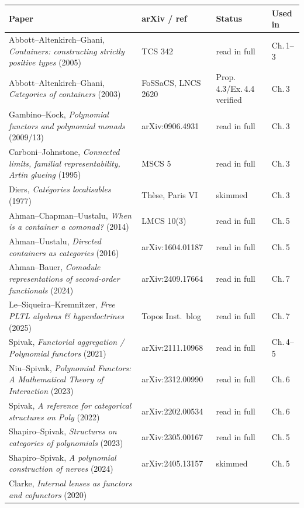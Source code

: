\documentclass[11pt,a4paper]{book}
\theoremstyle{plain}
\theoremstyle{definition}
\theoremstyle{remark}
\begin{document}
\begin{center}
\renewcommand{\arraystretch}{1.25}
\begin{tabular}{@{}p{5.4cm}p{3.1cm}p{2.4cm}p{2.6cm}@{}}
\toprule
\textbf{Paper} & \textbf{arXiv / ref} & \textbf{Status} & \textbf{Used in} \\
\midrule
Abbott--Altenkirch--Ghani, \emph{Containers: constructing strictly positive types} (2005)
  & TCS 342 & read in full & Ch.\,1--3 \\
Abbott--Altenkirch--Ghani, \emph{Categories of containers} (2003)
  & FoSSaCS, LNCS 2620 & Prop.\,4.3/Ex.\,4.4 verified & Ch.\,3 \\
Gambino--Kock, \emph{Polynomial functors and polynomial monads} (2009/13)
  & arXiv:0906.4931 & read in full & Ch.\,3 \\
Carboni--Johnstone, \emph{Connected limits, familial representability, Artin glueing} (1995)
  & MSCS 5 & read in full & Ch.\,3 \\
Diers, \emph{Cat\'egories localisables} (1977)
  & Th\`ese, Paris VI & skimmed & Ch.\,3 \\
Ahman--Chapman--Uustalu, \emph{When is a container a comonad?} (2014)
  & LMCS 10(3) & read in full & Ch.\,5 \\
Ahman--Uustalu, \emph{Directed containers as categories} (2016)
  & arXiv:1604.01187 & read in full & Ch.\,5 \\
Ahman--Bauer, \emph{Comodule representations of second-order functionals} (2024)
  & arXiv:2409.17664 & read in full & Ch.\,7 \\
Le--Siqueira--Kremnitzer, \emph{Free PLTL algebras \& hyperdoctrines} (2025)
  & Topos Inst.\ blog & read in full & Ch.\,7 \\
Spivak, \emph{Functorial aggregation / Polynomial functors} (2021)
  & arXiv:2111.10968 & read in full & Ch.\,4--5 \\
Niu--Spivak, \emph{Polynomial Functors: A Mathematical Theory of Interaction} (2023)
  & arXiv:2312.00990 & read in full & Ch.\,6 \\
Spivak, \emph{A reference for categorical structures on \textup{Poly}} (2022)
  & arXiv:2202.00534 & read in full & Ch.\,6 \\
Shapiro--Spivak, \emph{Structures on categories of polynomials} (2023)
  & arXiv:2305.00167 & read in full & Ch.\,5 \\
Shapiro--Spivak, \emph{A polynomial construction of nerves} (2024)
  & arXiv:2405.13157 & skimmed & Ch.\,5 \\
Clarke, \emph{Internal lenses as functors and cofunctors} (2020)

\end{tabular}
\end{center}
\end{document}
